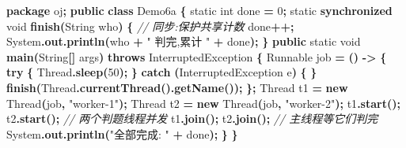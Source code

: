 \documentclass[
  11pt,
]{ctexart}
\newenvironment{Shaded}{\begin{snugshade}}{\end{snugshade}}
\newcommand{\BuiltInTok}[1]{#1}
\newcommand{\CommentTok}[1]{\textcolor[rgb]{0.56,0.35,0.01}{\textit{#1}}}
\newcommand{\ControlFlowTok}[1]{\textcolor[rgb]{0.13,0.29,0.53}{\textbf{#1}}}
\newcommand{\DataTypeTok}[1]{\textcolor[rgb]{0.13,0.29,0.53}{#1}}
\newcommand{\DecValTok}[1]{\textcolor[rgb]{0.00,0.00,0.81}{#1}}
\newcommand{\FunctionTok}[1]{\textcolor[rgb]{0.13,0.29,0.53}{\textbf{#1}}}
\newcommand{\ImportTok}[1]{#1}
\newcommand{\KeywordTok}[1]{\textcolor[rgb]{0.13,0.29,0.53}{\textbf{#1}}}
\newcommand{\NormalTok}[1]{#1}
\newcommand{\OperatorTok}[1]{\textcolor[rgb]{0.81,0.36,0.00}{\textbf{#1}}}
\newcommand{\StringTok}[1]{\textcolor[rgb]{0.31,0.60,0.02}{#1}}
\begin{document}
\begin{Shaded}
\begin{Highlighting}[]
\KeywordTok{package}\ImportTok{ oj}\OperatorTok{;}
\KeywordTok{public} \KeywordTok{class}\NormalTok{ Demo6a }\OperatorTok{\{}
    \DataTypeTok{static} \DataTypeTok{int}\NormalTok{ done }\OperatorTok{=} \DecValTok{0}\OperatorTok{;}
    \DataTypeTok{static} \KeywordTok{synchronized} \DataTypeTok{void} \FunctionTok{finish}\OperatorTok{(}\BuiltInTok{String}\NormalTok{ who}\OperatorTok{)} \OperatorTok{\{}     \CommentTok{// 同步:保护共享计数}
\NormalTok{        done}\OperatorTok{++;}
        \BuiltInTok{System}\OperatorTok{.}\FunctionTok{out}\OperatorTok{.}\FunctionTok{println}\OperatorTok{(}\NormalTok{who }\OperatorTok{+} \StringTok{" 判完,累计 "} \OperatorTok{+}\NormalTok{ done}\OperatorTok{);}
    \OperatorTok{\}}
    \KeywordTok{public} \DataTypeTok{static} \DataTypeTok{void} \FunctionTok{main}\OperatorTok{(}\BuiltInTok{String}\OperatorTok{[]}\NormalTok{ args}\OperatorTok{)} \KeywordTok{throws} \BuiltInTok{InterruptedException} \OperatorTok{\{}
        \BuiltInTok{Runnable}\NormalTok{ job }\OperatorTok{=} \OperatorTok{()} \OperatorTok{{-}\textgreater{}} \OperatorTok{\{}
            \ControlFlowTok{try} \OperatorTok{\{} \BuiltInTok{Thread}\OperatorTok{.}\FunctionTok{sleep}\OperatorTok{(}\DecValTok{50}\OperatorTok{);} \OperatorTok{\}} \ControlFlowTok{catch} \OperatorTok{(}\BuiltInTok{InterruptedException}\NormalTok{ e}\OperatorTok{)} \OperatorTok{\{} \OperatorTok{\}}
            \FunctionTok{finish}\OperatorTok{(}\BuiltInTok{Thread}\OperatorTok{.}\FunctionTok{currentThread}\OperatorTok{().}\FunctionTok{getName}\OperatorTok{());}
        \OperatorTok{\};}
        \BuiltInTok{Thread}\NormalTok{ t1 }\OperatorTok{=} \KeywordTok{new} \BuiltInTok{Thread}\OperatorTok{(}\NormalTok{job}\OperatorTok{,} \StringTok{"worker{-}1"}\OperatorTok{);}
        \BuiltInTok{Thread}\NormalTok{ t2 }\OperatorTok{=} \KeywordTok{new} \BuiltInTok{Thread}\OperatorTok{(}\NormalTok{job}\OperatorTok{,} \StringTok{"worker{-}2"}\OperatorTok{);}
\NormalTok{        t1}\OperatorTok{.}\FunctionTok{start}\OperatorTok{();}\NormalTok{ t2}\OperatorTok{.}\FunctionTok{start}\OperatorTok{();}                        \CommentTok{// 两个判题线程并发}
\NormalTok{        t1}\OperatorTok{.}\FunctionTok{join}\OperatorTok{();}\NormalTok{  t2}\OperatorTok{.}\FunctionTok{join}\OperatorTok{();}                          \CommentTok{// 主线程等它们判完}
        \BuiltInTok{System}\OperatorTok{.}\FunctionTok{out}\OperatorTok{.}\FunctionTok{println}\OperatorTok{(}\StringTok{"全部完成: "} \OperatorTok{+}\NormalTok{ done}\OperatorTok{);}
    \OperatorTok{\}}
\OperatorTok{\}}
\end{Highlighting}
\end{Shaded}
\end{document}

